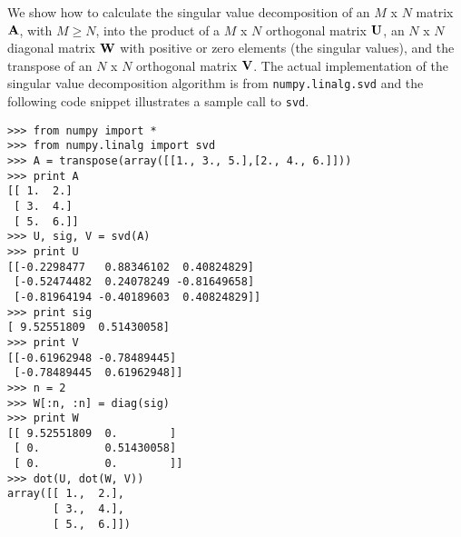 We show how to calculate the singular value decomposition  of an $M$ x $N$ matrix $\bf{A}$, with $M \ge N$,
into the product of a $M$ x $N$ orthogonal matrix $\bf{U}$, an
$N$ x $N$ diagonal matrix $\bf{W}$ with positive or zero elements (the
singular values), and the transpose of an $N$ x $N$ orthogonal matrix
$\bf{V}$. The actual implementation of the singular value decomposition 
algorithm is from \verb|numpy.linalg.svd| and the following code snippet illustrates 
a sample call to \verb|svd|.

\begin{verbatim}
>>> from numpy import *
>>> from numpy.linalg import svd
>>> A = transpose(array([[1., 3., 5.],[2., 4., 6.]]))
>>> print A
[[ 1.  2.]
 [ 3.  4.]
 [ 5.  6.]]
>>> U, sig, V = svd(A)
>>> print U
[[-0.2298477   0.88346102  0.40824829]
 [-0.52474482  0.24078249 -0.81649658]
 [-0.81964194 -0.40189603  0.40824829]]
>>> print sig
[ 9.52551809  0.51430058]
>>> print V
[[-0.61962948 -0.78489445]
 [-0.78489445  0.61962948]]
>>> n = 2
>>> W[:n, :n] = diag(sig)
>>> print W
[[ 9.52551809  0.        ]
 [ 0.          0.51430058]
 [ 0.          0.        ]]
>>> dot(U, dot(W, V))
array([[ 1.,  2.],
       [ 3.,  4.],
       [ 5.,  6.]])
\end{verbatim}

